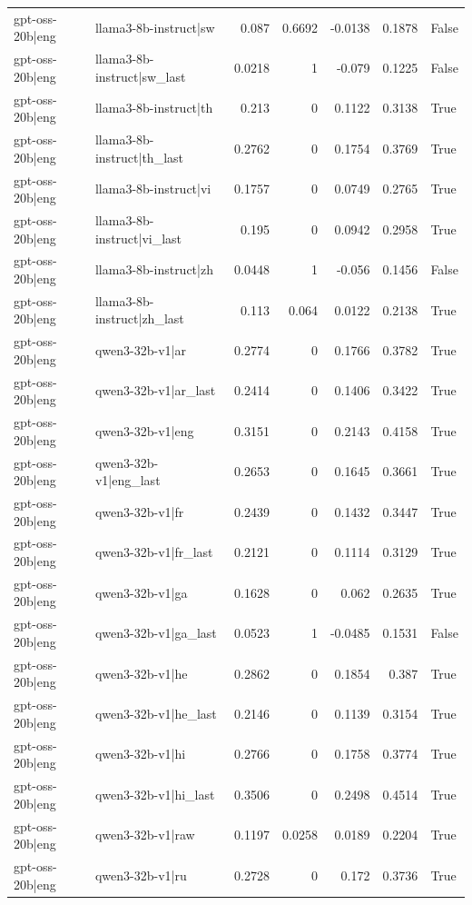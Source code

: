 \begin{table}
\begin{tabular}{l l r r r r l}
gpt-oss-20b|eng & llama3-8b-instruct|sw & 0.087 & 0.6692 & -0.0138 & 0.1878 & False \\
gpt-oss-20b|eng & llama3-8b-instruct|sw_last & 0.0218 & 1 & -0.079 & 0.1225 & False \\
gpt-oss-20b|eng & llama3-8b-instruct|th & 0.213 & 0 & 0.1122 & 0.3138 & True \\
gpt-oss-20b|eng & llama3-8b-instruct|th_last & 0.2762 & 0 & 0.1754 & 0.3769 & True \\
gpt-oss-20b|eng & llama3-8b-instruct|vi & 0.1757 & 0 & 0.0749 & 0.2765 & True \\
gpt-oss-20b|eng & llama3-8b-instruct|vi_last & 0.195 & 0 & 0.0942 & 0.2958 & True \\
gpt-oss-20b|eng & llama3-8b-instruct|zh & 0.0448 & 1 & -0.056 & 0.1456 & False \\
gpt-oss-20b|eng & llama3-8b-instruct|zh_last & 0.113 & 0.064 & 0.0122 & 0.2138 & True \\
gpt-oss-20b|eng & qwen3-32b-v1|ar & 0.2774 & 0 & 0.1766 & 0.3782 & True \\
gpt-oss-20b|eng & qwen3-32b-v1|ar_last & 0.2414 & 0 & 0.1406 & 0.3422 & True \\
gpt-oss-20b|eng & qwen3-32b-v1|eng & 0.3151 & 0 & 0.2143 & 0.4158 & True \\
gpt-oss-20b|eng & qwen3-32b-v1|eng_last & 0.2653 & 0 & 0.1645 & 0.3661 & True \\
gpt-oss-20b|eng & qwen3-32b-v1|fr & 0.2439 & 0 & 0.1432 & 0.3447 & True \\
gpt-oss-20b|eng & qwen3-32b-v1|fr_last & 0.2121 & 0 & 0.1114 & 0.3129 & True \\
gpt-oss-20b|eng & qwen3-32b-v1|ga & 0.1628 & 0 & 0.062 & 0.2635 & True \\
gpt-oss-20b|eng & qwen3-32b-v1|ga_last & 0.0523 & 1 & -0.0485 & 0.1531 & False \\
gpt-oss-20b|eng & qwen3-32b-v1|he & 0.2862 & 0 & 0.1854 & 0.387 & True \\
gpt-oss-20b|eng & qwen3-32b-v1|he_last & 0.2146 & 0 & 0.1139 & 0.3154 & True \\
gpt-oss-20b|eng & qwen3-32b-v1|hi & 0.2766 & 0 & 0.1758 & 0.3774 & True \\
gpt-oss-20b|eng & qwen3-32b-v1|hi_last & 0.3506 & 0 & 0.2498 & 0.4514 & True \\
gpt-oss-20b|eng & qwen3-32b-v1|raw & 0.1197 & 0.0258 & 0.0189 & 0.2204 & True \\
gpt-oss-20b|eng & qwen3-32b-v1|ru & 0.2728 & 0 & 0.172 & 0.3736 & True \\

\end{tabular}
\end{table}
